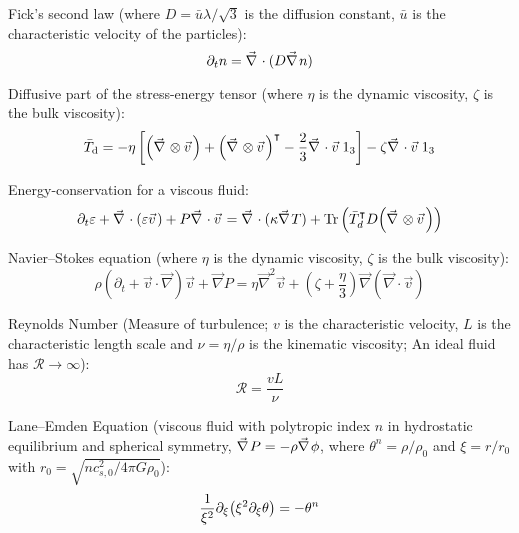 			Fick's second law (where $D = \bar{u} \lambda/\sqrt{3}$ is the diffusion constant, $\bar{u}$ is the characteristic velocity of the particles):
			\begin{equation}
				\partial_t n = \Nabla \cdot (D \Nabla n)
			\end{equation}

			\noindent
			Diffusive part of the stress-energy tensor (where $\eta$ is the dynamic viscosity, $\zeta$ is the bulk viscosity):
			\begin{equation}
				\bar{T}_{\mathrm{d}}=-\eta\left[\left(\vec{\nabla}\otimes\vec{v}\right)+\left(\vec{\nabla}\otimes\vec{v}\right)^\trp-\frac{2}{3}\vec{\nabla}\cdot\vec{v}\,1_{3}\right]-\zeta\vec{\nabla}\cdot\vec{v}\,1_{3}
			\end{equation}

			\noindent
			Energy-conservation for a viscous fluid:
			\begin{equation}
				\partial_t \varepsilon + \Nabla \cdot (\varepsilon \vec{v}) + P \Nabla \cdot \vec{v} = \Nabla \cdot (\kappa \Nabla T) + \tr\qty(\bar{T}_d^\trp D \qty(\Nabla \otimes\vec{v}))
			\end{equation}

			\noindent
			Navier--Stokes equation (where $\eta$ is the dynamic viscosity, $\zeta$ is the bulk viscosity):
			\begin{equation}
				\rho\left(\partial_{t}+\vec{v}\cdot\vec{\nabla}\right)\vec{v}+\vec{\nabla}P=\eta\vec{\nabla}^{2}\vec{v}+\left(\zeta+\frac{\eta}{3}\right)\vec{\nabla}\left(\vec{\nabla}\cdot\vec{v}\right)
			\end{equation}

			\noindent
			Reynolds Number (Measure of turbulence; $v$ is the characteristic velocity, $L$ is the characteristic length scale and $\nu = \eta / \rho$ is the kinematic viscosity; An ideal fluid has $\mathcal{R} \to \infty$):
			\begin{equation}
				\mathcal{R} = \frac{v L}{\nu}
			\end{equation}

			\noindent
			Lane--Emden Equation (viscous fluid with polytropic index $n$ in hydrostatic equilibrium and spherical symmetry, \ie $\Nabla P = - \rho \Nabla \phi$, where $\theta^n = \rho/\rho_0$ and $\xi = r/r_0$ with $r_0 = \sqrt{n c_{s,0}^2 / 4\pi G \rho_0}$):
			\begin{equation}
				\frac{1}{\xi^2} \partial_\xi \qty(\xi^2 \partial_\xi \theta) = - \theta^n
			\end{equation}

